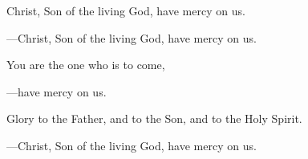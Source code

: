 \responsory

\begin{hangpar}
Christ, Son of the living God, have mercy on us.

{\color{red}---\thinspace }Christ, Son of the living God, have mercy on us.

\medskip You are the one who is to come,

{\color{red}---\thinspace }have mercy on us.

\medskip Glory to the Father, and to the Son, and to the Holy Spirit.

{\color{red}---\thinspace }Christ, Son of the living God, have mercy on us.
\end{hangpar}